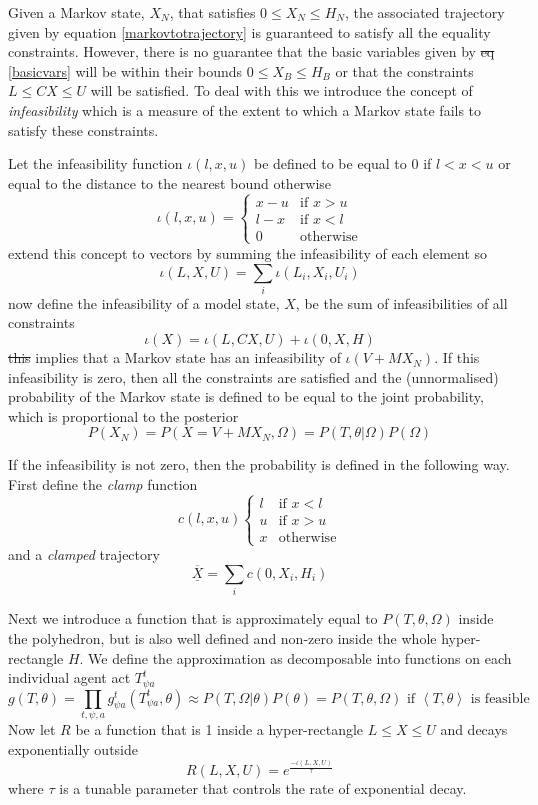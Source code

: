 \documentclass{article}
\providecommand{\DIFaddtex}[1]{{\protect\color{blue}\uwave{#1}}} %
\providecommand{\DIFdeltex}[1]{{\protect\color{red}\sout{#1}}}                      %
\providecommand{\DIFaddbegin}{} %
\providecommand{\DIFaddend}{} %
\providecommand{\DIFdelbegin}{} %
\providecommand{\DIFdelend}{} %
\providecommand{\DIFadd}[1]{\texorpdfstring{\DIFaddtex{#1}}{#1}} %
\providecommand{\DIFdel}[1]{\texorpdfstring{\DIFdeltex{#1}}{}} %
\newcommand{\DIFscaledelfig}{0.5}
\newlength{\DIFdelgraphicswidth} %
\newlength{\DIFdelgraphicsheight} %
\newcommand{\DIFaddincludegraphics}[2][]{{\color{blue}\fbox{\DIFOincludegraphics[#1]{#2}}}} %
\newcommand{\DIFdelincludegraphics}[2][]{%
\sbox{\DIFdelgraphicsbox}{\DIFOincludegraphics[#1]{#2}}%
\settoboxwidth{\DIFdelgraphicswidth}{\DIFdelgraphicsbox} %
\settoboxtotalheight{\DIFdelgraphicsheight}{\DIFdelgraphicsbox} %
\scalebox{\DIFscaledelfig}{%
\parbox[b]{\DIFdelgraphicswidth}{\usebox{\DIFdelgraphicsbox}\\[-\baselineskip] \rule{\DIFdelgraphicswidth}{0em}}\llap{\resizebox{\DIFdelgraphicswidth}{\DIFdelgraphicsheight}{%
\setlength{\unitlength}{\DIFdelgraphicswidth}%
\begin{picture}(1,1)%
\thicklines\linethickness{2pt} %
{\color[rgb]{1,0,0}\put(0,0){\framebox(1,1){}}}%
{\color[rgb]{1,0,0}\put(0,0){\line( 1,1){1}}}%
{\color[rgb]{1,0,0}\put(0,1){\line(1,-1){1}}}%
\end{picture}%
}\hspace*{3pt}}} %
} %
\DeclareRobustCommand{\DIFaddbegin}{\DIFOaddbegin \let\includegraphics\DIFaddincludegraphics} %
\DeclareRobustCommand{\DIFaddend}{\DIFOaddend \let\includegraphics\DIFOincludegraphics} %
\DeclareRobustCommand{\DIFdelbegin}{\DIFOdelbegin \let\includegraphics\DIFdelincludegraphics} %
\DeclareRobustCommand{\DIFdelend}{\DIFOaddend \let\includegraphics\DIFOincludegraphics} %
\begin{document}
Given a Markov state, $X_N$, that satisfies $0 \le X_N \le H_N$, the associated trajectory given by equation \eqref{markovtotrajectory} is guaranteed to satisfy all the equality constraints. However, there is no guarantee that the basic variables given by \DIFdelbegin \DIFdel{eq }\DIFdelend \eqref{basicvars} will be within their bounds $0 \le X_B \le H_B$ or that the constraints $L \le CX \le U$ will be satisfied. To deal with this we introduce the concept of \textit{infeasibility} which is a measure of the extent to which a Markov state fails to satisfy these constraints.

Let the infeasibility function $\iota(l,x,u)$ be defined to be equal to 0 if $l < x < u$ or equal to the distance to the nearest bound otherwise
\[
\iota(l,x,u) =
\begin{cases}
x-u & \text{if }x>u\\
l-x & \text{if }x<l\\
0 & \text{otherwise}
\end{cases}
\]
extend this concept to vectors by summing the infeasibility of each element so
\[
\iota(L,X,U) = \sum_i \iota(L_i,X_i,U_i)
\]
now define the infeasibility of a model state, $X$, be the sum of infeasibilities of all constraints
\[
\iota(X) = \iota(L, CX, U) + \iota(0, X, H)
\]
\DIFdelbegin \DIFdel{this }\DIFdelend \DIFaddbegin \DIFadd{This }\DIFaddend implies that a Markov state has an infeasibility of $\iota(V + MX_N)$. If this infeasibility is zero, then all the constraints are satisfied and the (unnormalised) probability of the Markov state is defined to be equal to the joint probability, which is proportional to the posterior
\[
P(X_N) = P(X=V + MX_N,\Omega) = P(T,\theta|\Omega)P(\Omega)
\]

If the infeasibility is not zero, then the probability is defined in the following way. First define the \textit{clamp} function
\[
c(l,x,u) \begin{cases}
l & \text{if }x<l\\
u & \text{if }x>u\\
x & \text{otherwise}
\end{cases}
\]
and a \textit{clamped} trajectory
\[
\overline{\underline{X}} = \sum_i c(0,X_i,H_i)
\]

Next we introduce a function that is approximately equal to $P(T,\theta,\Omega)$ inside the polyhedron, but is also well defined and non-zero inside the whole hyper-rectangle $H$. We define the approximation as decomposable into functions on each individual agent act $T^t_{\psi a}$
\[
g(T,\theta) = \prod_{t,\psi,a} g^t_{\psi a}(T^t_{\psi a},\theta) \approx P(T,\Omega|\theta)P(\theta) = P(T,\theta,\Omega) \text{ if }\left<T,\theta\right>\text{ is feasible}
\]
Now let $R$ be a function that is 1 inside a hyper-rectangle $L \le X \le U$ and decays exponentially outside
\[
R(L,X,U) = e^{\frac{-\iota(L,X,U)}{\tau}}
\]
where $\tau$ is a tunable parameter that controls the rate of exponential decay.
\end{document}
